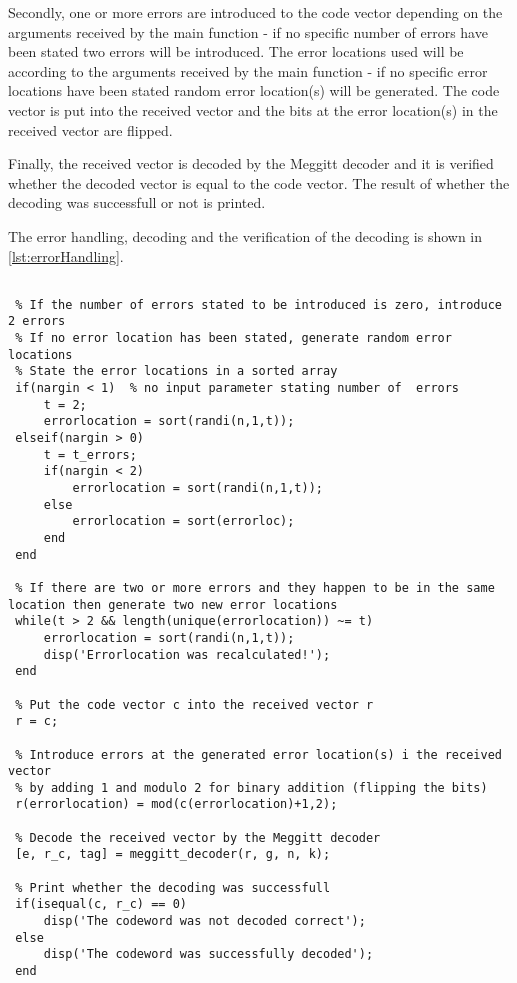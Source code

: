 \documentclass[Main]{subfiles}
\begin{document}
Secondly, one or more errors are introduced to the code vector depending on the arguments received by the main function - if no specific number of errors have been stated two errors will be introduced. 
The error locations used will be according to the arguments received by the main function - if no specific error locations have been stated random error location(s) will be generated. 
The code vector is put into the received vector and the bits at the error location(s) in the received vector are flipped.

Finally, the received vector is decoded by the Meggitt decoder and it is verified whether the decoded vector is equal to the code vector. The result of whether the decoding was successfull or not is printed.

The error handling, decoding and the verification of the decoding is shown in \codeTitle \ref{lst:errorHandling}.

\begin{lstlisting}[caption=Error Handling and Decoding, style=Code-Matlab, label=lst:errorHandling]
 % Transmit the code vector through an artificial communication channel, i.e. introduce at least one error to the code vector:

 % If the number of errors stated to be introduced is zero, introduce 2 errors
 % If no error location has been stated, generate random error locations
 % State the error locations in a sorted array
 if(nargin < 1)  % no input parameter stating number of  errors
     t = 2;
     errorlocation = sort(randi(n,1,t));
 elseif(nargin > 0)
     t = t_errors;
     if(nargin < 2)
         errorlocation = sort(randi(n,1,t));
     else
         errorlocation = sort(errorloc);
     end
 end

 % If there are two or more errors and they happen to be in the same location then generate two new error locations
 while(t > 2 && length(unique(errorlocation)) ~= t)
     errorlocation = sort(randi(n,1,t));
     disp('Errorlocation was recalculated!');
 end

 % Put the code vector c into the received vector r
 r = c;

 % Introduce errors at the generated error location(s) i the received vector
 % by adding 1 and modulo 2 for binary addition (flipping the bits)
 r(errorlocation) = mod(c(errorlocation)+1,2);

 % Decode the received vector by the Meggitt decoder
 [e, r_c, tag] = meggitt_decoder(r, g, n, k);

 % Print whether the decoding was successfull 
 if(isequal(c, r_c) == 0)
     disp('The codeword was not decoded correct');
 else
     disp('The codeword was successfully decoded');
 end
\end{lstlisting}
\end{document}
